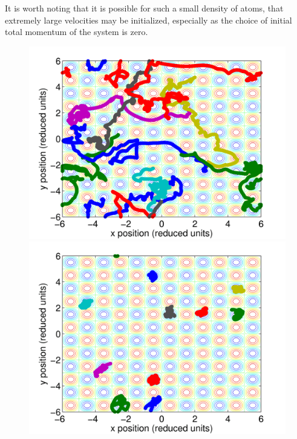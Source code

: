 \documentclass[12pt, oneside]{article}
\begin{document}
It is worth noting that it is possible for such a small density of atoms, that extremely large velocities may be initialized, especially as the choice of initial total momentum of the system is zero.

\begin{figure}
\begin{minipage}[!htbp]{.5\linewidth}
\includegraphics[width=\textwidth]{./figs/ex2-10n-acon0p1-tin0p1.png}
\subcaption{}
\end{minipage}
\hspace{0.02\linewidth}
\begin{minipage}[!htbp]{.5\linewidth}
\includegraphics[width=\textwidth]{./figs/ex2-10n-acon1-tin0p1.png}
\subcaption{}

\end{minipage}
\end{figure}
\end{document}
